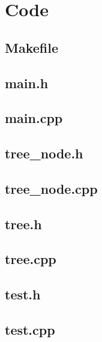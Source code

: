 \documentclass[12pt]{article}
\begin{document}

\section{Code}
\footnotesize
\subsection{Makefile}


\subsection{main.h}


\subsection{main.cpp}


\subsection{tree\_node.h}


\subsection{tree\_node.cpp}


\subsection{tree.h}


\subsection{tree.cpp}


\subsection{test.h}


\subsection{test.cpp}

\end{document}
